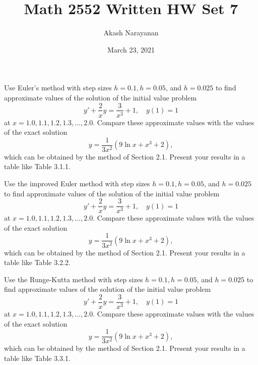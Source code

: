 \documentclass[11pt, titlepage]{article}
\title{Math 2552 Written HW Set 7}
\author{Akash Narayanan}
\date{March 23, 2021}
\begin{document}
    \maketitle

    \begin{problem}[Trench 3.1.7]
        Use Euler's method with step sizes $h = 0.1, h = 0.05$, and $h = 0.025$
        to find approximate values of the solution of the initial value problem
        \[
            y' + \frac{2}{x}y = \frac{3}{x^3} + 1, \quad y(1) = 1
        \] 
        at $x = 1.0, 1.1, 1.2, 1.3, \ldots, 2.0.$ Compare these approximate
        values with the values of the exact solution
        \[
            y = \frac{1}{3x^2}(9 \ln x + x^3 + 2),
        \] 
        which can be obtained by the method of Section 2.1. Present your results
        in a table like Table 3.1.1.
    \end{problem}

    \pagebreak

    \begin{problem}[Trench 3.2.7]
        Use the improved Euler method with step sizes $h = 0.1, h = 0.05$, and
        $h = 0.025$ to find approximate values of the solution of the initial
        value problem
        \[
            y' + \frac{2}{x}y = \frac{3}{x^3} + 1, \quad y(1) = 1
        \] 
        at $x = 1.0, 1.1, 1.2, 1.3, \ldots, 2.0.$ Compare these approximate
        values with the values of the exact solution
        \[
            y = \frac{1}{3x^2}(9 \ln x + x^3 + 2),
        \] 
        which can be obtained by the method of Section 2.1. Present your results
        in a table like Table 3.2.2.
    \end{problem}

    \pagebreak

    \begin{problem}[Trench 3.3.7]
        Use the Runge-Kutta method with step sizes $h = 0.1, h = 0.05$, and
        $h = 0.025$ to find approximate values of the solution of the initial
        value problem
        \[
            y' + \frac{2}{x}y = \frac{3}{x^3} + 1, \quad y(1) = 1
        \] 
        at $x = 1.0, 1.1, 1.2, 1.3, \ldots, 2.0.$ Compare these approximate
        values with the values of the exact solution
        \[
            y = \frac{1}{3x^2}(9 \ln x + x^3 + 2),
        \] 
        which can be obtained by the method of Section 2.1. Present your results
        in a table like Table 3.3.1.

    \end{problem}
\end{document}
